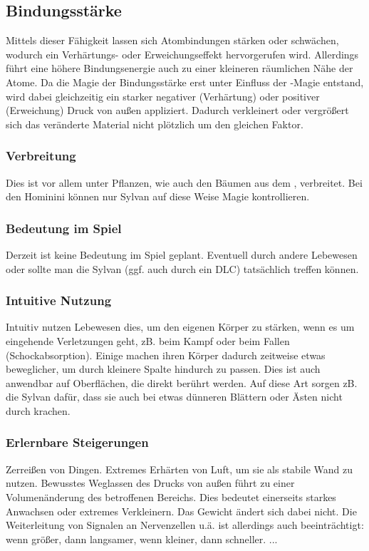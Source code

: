 \subsection{Bindungsstärke}\label{magie:bindung}
Mittels dieser Fähigkeit lassen sich Atombindungen stärken oder schwächen, wodurch ein Verhärtungs- oder Erweichungseffekt hervorgerufen wird. 
Allerdings führt eine höhere Bindungsenergie auch zu einer kleineren räumlichen Nähe der Atome. 
Da die Magie der Bindungsstärke erst unter Einfluss der -Magie entstand, wird dabei gleichzeitig ein starker negativer (Verhärtung) oder positiver (Erweichung) Druck von außen appliziert. 
Dadurch verkleinert oder vergrößert sich das veränderte Material nicht plötzlich um den gleichen Faktor.

\subsubsection{Verbreitung}
Dies ist vor allem unter Pflanzen, wie auch den Bäumen aus dem , verbreitet.
Bei den Hominini können nur Sylvan auf diese Weise Magie kontrollieren.

\subsubsection{Bedeutung im Spiel}
Derzeit ist keine Bedeutung im Spiel geplant. 
Eventuell durch andere Lebewesen oder sollte man die Sylvan (ggf. auch durch ein DLC) tatsächlich treffen können.

\subsubsection{Intuitive Nutzung}
Intuitiv nutzen Lebewesen dies, um den eigenen Körper zu stärken, wenn es um eingehende Verletzungen geht, zB. beim Kampf oder beim Fallen (Schockabsorption). 
Einige machen ihren Körper dadurch zeitweise etwas beweglicher, um durch kleinere Spalte hindurch zu passen.
Dies ist auch anwendbar auf Oberflächen, die direkt berührt werden. 
Auf diese Art sorgen zB. die Sylvan dafür, dass sie auch bei etwas dünneren Blättern oder Ästen nicht durch krachen.

\subsubsection{Erlernbare Steigerungen}
\begin{outline}
	\1 Zerreißen von Dingen.
	\1 Extremes Erhärten von Luft, um sie als stabile Wand zu nutzen.
	\1 Bewusstes Weglassen des Drucks von außen führt zu einer Volumenänderung des betroffenen Bereichs. 
	Dies bedeutet einerseits starkes Anwachsen oder extremes Verkleinern. 
	Das Gewicht ändert sich dabei nicht. 
	Die Weiterleitung von Signalen an Nervenzellen u.ä. ist allerdings auch beeinträchtigt: wenn größer, dann langsamer, wenn kleiner, dann schneller.
	\1 ...
\end{outline}

